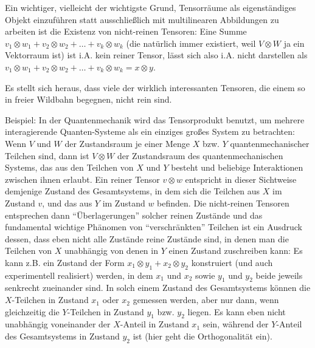 \begin{remark}
Ein wichtiger, vielleicht der wichtigste Grund, Tensorräume als eigenständiges Objekt einzuführen statt ausschließlich mit multilinearen Abbildungen zu arbeiten ist die Existenz von nicht-reinen Tensoren: Eine Summe $v_1\otimes w_1 + v_2\otimes w_2 + \ldots + v_k\otimes w_k$ (die natürlich immer existiert, weil $V\otimes W$ ja ein Vektorraum ist) ist i.A. kein reiner Tensor, lässt sich also i.A. nicht darstellen als $v_1\otimes w_1 + v_2\otimes w_2 + \ldots + v_k\otimes w_k = x\otimes y$.

\medbreak
Es stellt sich heraus, dass viele der wirklich interessanten Tensoren, die einem so in freier Wildbahn begegnen, nicht rein sind.

Beispiel: In der Quantenmechanik wird das Tensorprodukt benutzt, um mehrere interagierende Quanten-Systeme als ein einziges großes System zu betrachten: Wenn $V$ und $W$ der Zustandsraum je einer Menge $X$ bzw. $Y$ quantenmechanischer Teilchen sind, dann ist $V\otimes W$ der Zustandsraum des quantenmechanischen Systems, das aus den Teilchen von $X$ und $Y$ besteht und beliebige Interaktionen zwischen ihnen erlaubt. Ein reiner Tensor $v\otimes w$ entspricht in dieser Sichtweise demjenige Zustand des Gesamtsystems, in dem sich die Teilchen aus $X$ im Zustand $v$, und das aus $Y$ im Zustand $w$ befinden. Die nicht-reinen Tensoren entsprechen dann \enquote{Überlagerungen} solcher reinen Zustände und das fundamental wichtige Phänomen von \enquote{verschränkten} Teilchen ist ein Ausdruck dessen, dass eben nicht alle Zustände reine Zustände sind, in denen man die Teilchen von $X$ unabhängig von denen in $Y$ einen Zustand zuschreiben kann: Es kann z.B. ein Zustand der Form $x_1\otimes y_1 + x_2\otimes y_2$ konstruiert (und auch experimentell realisiert) werden, in dem $x_1$ und $x_2$ sowie $y_1$ und $y_2$ beide jeweils senkrecht zueinander sind. In solch einem Zustand des Gesamtsystems können die $X$-Teilchen in Zustand $x_1$ oder $x_2$ gemessen werden, aber nur dann, wenn gleichzeitig die $Y$-Teilchen in Zustand $y_1$ bzw. $y_2$ liegen. Es kann eben nicht unabhängig voneinander der $X$-Anteil in Zustand $x_1$ sein, während der $Y$-Anteil des Gesamtsystems in Zustand $y_2$ ist (hier geht die Orthogonalität ein).
\end{remark}

